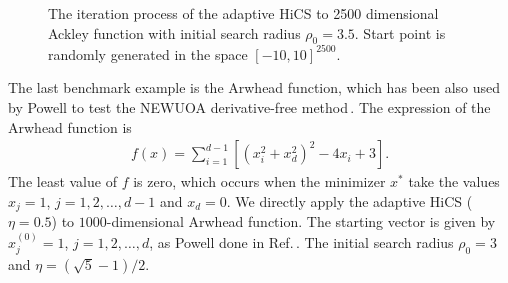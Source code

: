 \documentclass[mathpazo]{csam}
\theoremstyle{remark}
\begin{document}
\begin{figure}[!htbp]
	  \caption{The iteration process of the adaptive HiCS to 2500
	  dimensional Ackley function with initial search
	  radius $\rho_0=3.5$. Start point is randomly generated in the
	  space $[-10, 10]^{2500}$. } 
	\label{fig:ackley2500D:AHiCS}
\end{figure}

The last benchmark example is the Arwhead function, which has been
also used by Powell to test the NEWUOA derivative-free
method\,\cite{powell2006newuoa, powell2008developments}. The expression of the Arwhead function is
\begin{align}
	f(x) = \sum_{i=1}^{d-1}[(x_i^2+x_d^2)^2 - 4 x_i +3].
	\label{}
\end{align}
The least value of $f$ is zero, which occurs when the minimizer
$x^*$ take the values $x_j=1$, $j=1,2,\dots,d-1$ and $x_d=0$. 
We directly apply the adaptive HiCS ($\eta=0.5$) to $1000$-dimensional Arwhead function.
The starting vector is given by $x_j^{(0)}=1$, $j=1,2,\dots,d$, as
Powell done in Ref.\,\cite{powell2006newuoa}.
The initial search radius $\rho_0=3$ and $\eta=(\sqrt{5}-1)/2$.
\end{document}

